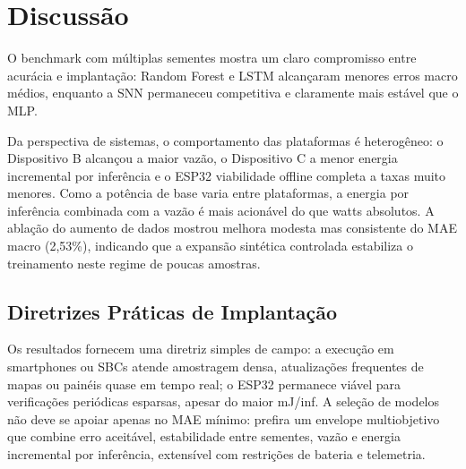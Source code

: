 \section{Discussão}

O benchmark com múltiplas sementes mostra um claro compromisso entre acurácia e implantação: Random Forest e LSTM alcançaram menores erros macro médios, enquanto a SNN permaneceu competitiva e claramente mais estável que o MLP. 

Da perspectiva de sistemas, o comportamento das plataformas é heterogêneo: o Dispositivo B alcançou a maior vazão, o Dispositivo C a menor energia incremental por inferência e o ESP32 viabilidade offline completa a taxas muito menores. Como a potência de base varia entre plataformas, a energia por inferência combinada com a vazão é mais acionável do que watts absolutos. A ablação do aumento de dados mostrou melhora modesta mas consistente do MAE macro (2,53\%), indicando que a expansão sintética controlada estabiliza o treinamento neste regime de poucas amostras.

\subsection{Diretrizes Práticas de Implantação}
Os resultados fornecem uma diretriz simples de campo: a execução em smartphones ou SBCs atende amostragem densa, atualizações frequentes de mapas ou painéis quase em tempo real; o ESP32 permanece viável para verificações periódicas esparsas, apesar do maior mJ/inf. A seleção de modelos não deve se apoiar apenas no MAE mínimo: prefira um envelope multiobjetivo que combine erro aceitável, estabilidade entre sementes, vazão e energia incremental por inferência, extensível com restrições de bateria e telemetria.


